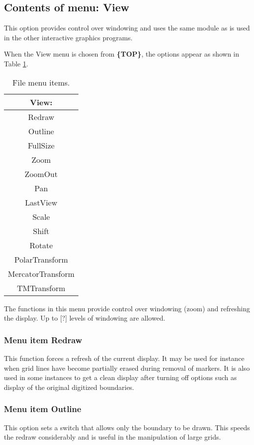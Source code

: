 \documentclass{article}
\begin{document}
\subsection{Contents of menu: View}
This option provides control over windowing and uses the same module as is used in the other interactive graphics programs.

When the View menu is chosen from \textbf{\{TOP\}}, the options appear as shown in Table \ref{tab:VIEW}.

\begin{table}[htb!]
 \caption{File menu items.}
  \begin{center}
   \begin{tabular}{|c|}
    \hline
View:\\     \hline
Redraw \\ Outline \\    \hline
FullSize \\ Zoom \\ ZoomOut \\ Pan \\ LastView \\    \hline
Scale \\ Shift \\ Rotate \\    \hline
PolarTransform \\ MercatorTransform \\ TMTransform \\
    \hline
   \end{tabular}
   \label{tab:VIEW}
  \end{center}
\end{table}


The functions in this menu provide control over windowing (zoom) and refreshing the display. Up to [?] levels of windowing are allowed.

\subsubsection{Menu item Redraw}
This function forces a refresh of the current display. It may be used for instance when grid lines have become partially erased during removal of markers. It is also used in some instances to get a clean display after turning off options such as display of the original digitized boundaries.

\subsubsection{Menu item Outline}
This option sets a switch that allows only the boundary to be drawn. This speeds the redraw considerably and is useful in the manipulation of large grids.
\end{document}
